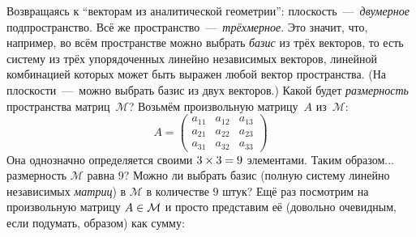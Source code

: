\documentclass[a4paper,12pt]{article}
\begin{document}
  Возвращаясь к ``векторам из аналитической геометрии'': плоскость~---~\emph{двумерное} подпространство.
  Всё же пространство~---~\emph{трёхмерное}.
  Это значит, что, например, во всём пространстве можно выбрать \emph{базис} из трёх векторов, то есть систему из трёх упорядоченных линейно независимых векторов, линейной комбинацией которых может быть выражен любой вектор пространства.
  (На плоскости~---~можно выбрать базис из двух векторов.)
  Какой будет \emph{размерность} пространства матриц~$\mathcal M$?
  Возьмём произвольную матрицу~$A$ из~$\mathcal M$:
  \[
    A = \begin{pmatrix}
      a_{11} & a_{12} & a_{13}\\
      a_{21} & a_{22} & a_{23}\\
      a_{31} & a_{32} & a_{33}
    \end{pmatrix}
  \]
  Она однозначно определяется своими $3 \hm\times 3 \hm= 9$ элементами.
  Таким образом... размерность $\mathcal M$ равна $9$?
  Можно ли выбрать базис (полную систему линейно независимых \emph{матриц}) в $\mathcal M$ в количестве $9$ штук?
  Ещё раз посмотрим на произвольную матрицу $A \hm\in \mathcal M$ и просто представим её (довольно очевидным, если подумать, образом) как сумму:
\end{document}
